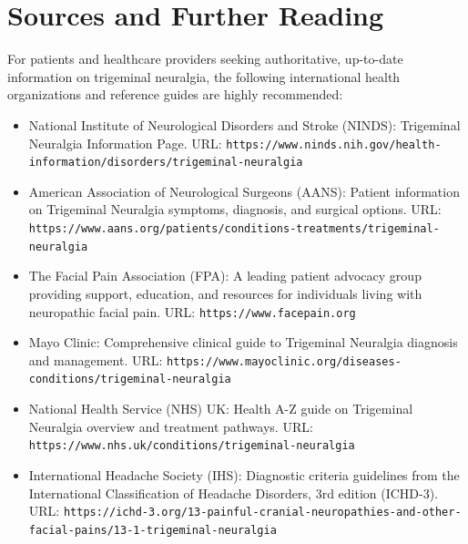 \section*{Sources and Further Reading}
For patients and healthcare providers seeking authoritative, up-to-date information on trigeminal neuralgia, the following international health organizations and reference guides are highly recommended:
\begin{itemize}
  \item National Institute of Neurological Disorders and Stroke (NINDS): Trigeminal Neuralgia Information Page. URL: \texttt{https://www.ninds.nih.gov/health-information/disorders/trigeminal-neuralgia}
  \item American Association of Neurological Surgeons (AANS): Patient information on Trigeminal Neuralgia symptoms, diagnosis, and surgical options. URL: \texttt{https://www.aans.org/patients/conditions-treatments/trigeminal-neuralgia}
  \item The Facial Pain Association (FPA): A leading patient advocacy group providing support, education, and resources for individuals living with neuropathic facial pain. URL: \texttt{https://www.facepain.org}
  \item Mayo Clinic: Comprehensive clinical guide to Trigeminal Neuralgia diagnosis and management. URL: \texttt{https://www.mayoclinic.org/diseases-conditions/trigeminal-neuralgia}
  \item National Health Service (NHS) UK: Health A-Z guide on Trigeminal Neuralgia overview and treatment pathways. URL: \texttt{https://www.nhs.uk/conditions/trigeminal-neuralgia}
  \item International Headache Society (IHS): Diagnostic criteria guidelines from the International Classification of Headache Disorders, 3rd edition (ICHD-3). URL: \texttt{https://ichd-3.org/13-painful-cranial-neuropathies-and-other-facial-pains/13-1-trigeminal-neuralgia}
\end{itemize}